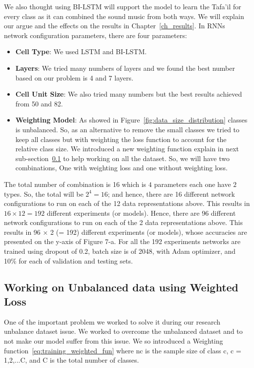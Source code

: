 We also thought using BI-LSTM will support the model to learn the Tafa'il for every class as it can combined the sound music from both ways. We will explain our argue and the effects on the results in Chapter~\ref{ch_results}.
In RNNs network configuration parameters, there are four parameters:
\begin{itemize}
\item \textbf{Cell Type}: We used LSTM and BI-LSTM.
\item \textbf{Layers}: We tried many numbers of layers and we found the best number based on our problem is 4 and 7 layers.
\item \textbf{Cell Unit Size}: We also tried many numbers but the best results achieved from 50 and 82.
\item \textbf{Weighting Model}: As showed in Figure~\ref{fig:data_size_distribution} classes is unbalanced. So, as an alternative to remove the small classes we tried to keep all classes but with weighting the loss function to account for the relative class size. We introduced a new weighting function explain in next sub-section~\ref{sec_w_loss} to help working on all the dataset. So, we will have two combinations, One with weighting loss and one without weighting loss.
  
\end{itemize}

The total number of combination is 16 which is $4$ parameters each one have $2$ types. So, the total will be $2^4=16$; and hence, there are 16 different network configurations to run on each of the 12 data representations above. This results in $16 \times 12 = 192$ different experiments (or models). Hence, there are 96 different network configurations to run on each of the 2 data representations above. This results in 96 × 2 (= 192) different experiments (or models), whose accuracies are presented on the y-axis of Figure 7-a.%
For all the 192 experiments networks are trained using dropout of 0.2, batch size is of 2048, with Adam optimizer, and 10\% for each of validation and testing sets.



\subsection{Working on Unbalanced data using Weighted Loss}\label{sec_w_loss}

One of the important problem we worked to solve it during our research unbalance dataset issue. We worked to overcome the unbalanced dataset and to not make our model suffer from this issue. We so introduced a Weighting function~\ref{eq:training_weighted_fun} where nc is the sample size of class c, c = 1,2,...C, and C
is the total number of classes.

